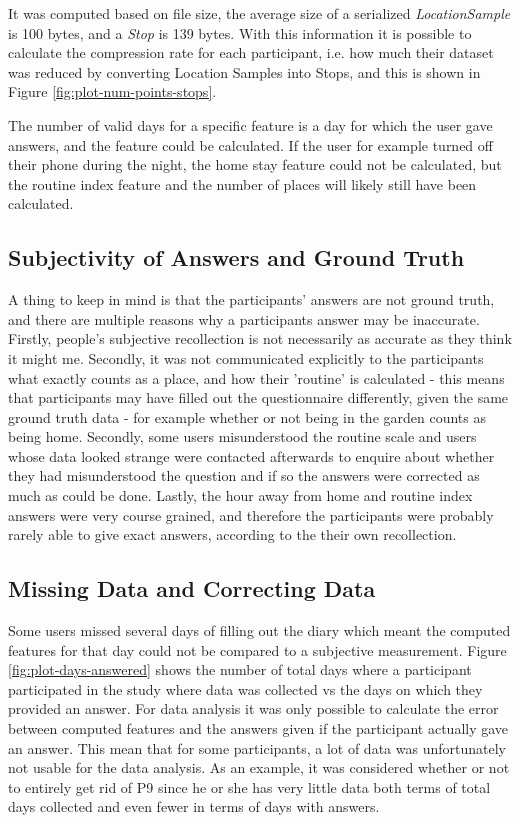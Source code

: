 It was computed based on file size, the average size of a serialized \textit{LocationSample} is 100 bytes, and a \textit{Stop} is 139 bytes. With this information it is possible to calculate the compression rate for each participant, i.e. how much their dataset was reduced by converting Location Samples into Stops, and this is shown in Figure \ref{fig:plot-num-points-stops}. 



The number of valid days for a specific feature is a day for which the user gave answers, and the feature could be calculated. If the user for example turned off their phone during the night, the home stay feature could not be calculated, but the routine index feature and the number of places will likely still have been calculated.


\subsection{Subjectivity of Answers and Ground Truth}
A thing to keep in mind is that the participants' answers are not ground truth, and there are multiple reasons why a participants answer may be inaccurate. Firstly, people's subjective recollection is not necessarily as accurate as they think it might me. Secondly, it was not communicated explicitly to the participants what exactly counts as a place, and how their 'routine' is calculated - this means that participants may have filled out the questionnaire differently, given the same ground truth data - for example whether or not being in the garden counts as being home. Secondly, some users misunderstood the routine scale and users whose data looked strange were contacted afterwards to enquire about whether they had misunderstood the question and if so the answers were corrected as much as could be done. Lastly, the hour away from home and routine index answers were very course grained, and therefore the participants were probably rarely able to give exact answers, according to the their own recollection. 

\subsection{Missing Data and Correcting Data}
Some users missed several days of filling out the diary which meant the computed features for that day could not be compared to a subjective measurement. Figure \ref{fig:plot-days-answered} shows the number of total days where a participant participated in the study where data was collected vs the days on which they provided an answer. For data analysis it was only possible to calculate the error between computed features and the answers given if the participant actually gave an answer. This mean that for some participants, a lot of data was unfortunately not usable for the data analysis. As an example, it was considered whether or not to entirely get rid of P9 since he or she has very little data both terms of total days collected and even fewer in terms of days with answers. 

